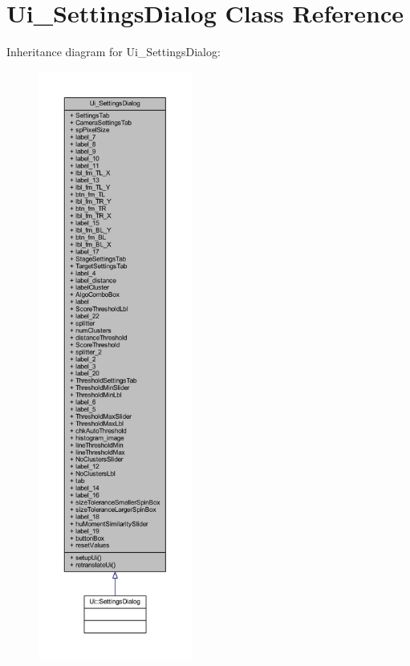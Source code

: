 \hypertarget{class_ui___settings_dialog}{}\section{Ui\+\_\+\+Settings\+Dialog Class Reference}
\label{class_ui___settings_dialog}


Inheritance diagram for Ui\+\_\+\+Settings\+Dialog\+:
\nopagebreak
\begin{figure}[H]
\begin{center}
\leavevmode
\includegraphics[height=550pt]{class_ui___settings_dialog__inherit__graph}
\end{center}
\end{figure}


